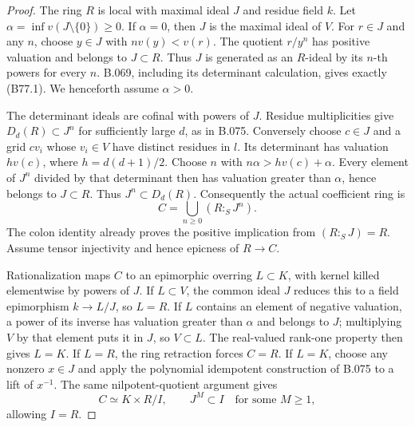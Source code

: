 \begin{proof}
The ring $R$ is local with maximal ideal $J$ and residue field $k$.
Let $\alpha=\inf v(J\setminus\{0\})\ge0$.
If $\alpha=0$, then $J$ is the maximal ideal of $V$. For $r\in J$ and
any $n$, choose $y\in J$ with $nv(y)<v(r)$. The quotient $r/y^n$ has
positive valuation and belongs to $J\subset R$. Thus $J$ is generated
as an $R$-ideal by its $n$-th powers for every $n$. B.069, including
its determinant calculation, gives exactly (B77.1).
We henceforth assume $\alpha>0$.

The determinant ideals are cofinal with powers of $J$.
Residue multiplicities give $D_d(R)\subset J^n$ for sufficiently
large $d$, as in B.075. Conversely choose $c\in J$ and a grid
$cv_i$ whose $v_i\in V$ have distinct residues in $l$.
Its determinant has valuation $h v(c)$, where $h=d(d+1)/2$.
Choose $n$ with $n\alpha>hv(c)+\alpha$. Every element of $J^n$ divided
by that determinant then has valuation greater than $\alpha$, hence
belongs to $J\subset R$. Thus $J^n\subset D_d(R)$.
Consequently the actual coefficient ring is
\[
                    C=\bigcup_{n\ge0}(R:_S J^n).          \tag{B77.2}
\]
The colon identity already proves the positive implication from
$(R:_S J)=R$. Assume tensor injectivity and hence epicness of $R\to C$.

Rationalization maps $C$ to an epimorphic overring $L\subset K$, with
kernel killed elementwise by powers of $J$. If $L\subset V$, the common
ideal $J$ reduces this to a field epimorphism $k\to L/J$, so $L=R$.
If $L$ contains an element of negative valuation, a power of its inverse
has valuation greater than $\alpha$ and belongs to $J$; multiplying
$V$ by that element puts it in $J$, so $V\subset L$.
The real-valued rank-one property then gives $L=K$.
If $L=R$, the ring retraction forces $C=R$.
If $L=K$, choose any nonzero $x\in J$ and apply the polynomial
idempotent construction of B.075 to a lift of $x^{-1}$.
The same nilpotent-quotient argument gives
\[
                  C\simeq K\times R/I,\qquad J^M\subset I
                    \quad\text{for some }M\ge1,           \tag{B77.3}
\]
allowing $I=R$.


\end{proof}
